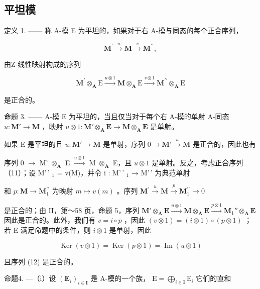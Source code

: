 \subsection{平坦模}

定义 1. —— 称 A-模 E 为平坦的，如果对于右 A-模与同态的每个正合序列，

\[
\mathbf {M} ^ {\prime} \xrightarrow {u} \mathbf {M} \xrightarrow {v} \mathbf {M} ^ {\prime \prime},\tag{11}
\]

由Z-线性映射构成的序列

\[
\mathbf {M} ^ {\prime} \otimes_ {\mathbf {A}} \mathrm{E} \xrightarrow {u \otimes 1} \mathbf {M} \otimes_ {\mathbf {A}} \mathrm{E} \xrightarrow {v \otimes 1} \mathbf {M} ^ {\prime \prime} \otimes_ {\mathbf {A}} \mathrm{E}\tag{12}
\]

是正合的。

命题 3. —— A-模 E 为平坦的，当且仅当对于每个右 A-模的单射 A-同态 \(u: \mathbf{M}' \to \mathbf{M}\) ，映射 \(u \otimes 1: \mathbf{M}' \otimes_{\mathbf{A}} \mathbf{E} \to \mathbf{M} \otimes_{\mathbf{A}} \mathbf{E}\) 是单射。

如果 E 是平坦的且 \(u: \mathbf{M}' \to \mathbf{M}\) 是单射，序列 \(0 \longrightarrow \mathbf{M}' \stackrel{u}{\longrightarrow} \mathbf{M}\) 是正合的，因此也有

序列 0 \(\longrightarrow\) M' \(\otimes_{\mathbf{A}}\) E \(\xrightarrow{u\otimes1}\) M \(\otimes_{\mathbf{A}}\) E，且 \(u\otimes1\) 是单射。反之，考虑正合序列（11）；设 M'\,' \(_{1}\) = v(M)，并令 i : M'\,' \(_{1}\) → M'\,' 为典范单射

和 \(p:\mathbf{M}\to\mathbf{M}_{1}^{\prime\prime}\) 为映射 \(m\mapsto v(m)\) 。序列 \(\mathbf{M}^{\prime}\xrightarrow{u}\mathbf{M}\xrightarrow{p}\mathbf{M}_{1}^{\prime\prime}\longrightarrow0\)

是正合的；由 II，第～58 页，命题 5，序列 \(\mathbf{M}' \otimes_{\mathbf{A}} \mathbf{E} \xrightarrow{u \otimes 1} \mathbf{M} \otimes_{\mathbf{A}} \mathbf{E} \xrightarrow{p \otimes 1} \mathbf{M}_{1}'' \otimes_{\mathbf{A}} \mathbf{E}\) 因此是正合的。此外，我们有 \(v = i \circ p\) ，因此 \((v \otimes 1) = (i \otimes 1) \circ (p \otimes 1)\) ；若 E 满足命题中的条件，则 \(i \otimes 1\) 是单射，因此

\[
\operatorname{Ker} (v \otimes 1) = \operatorname{Ker} (p \otimes 1) = \operatorname{Im} (u \otimes 1)
\]

且序列 (12) 是正合的。

命题4. ---（i）设 \((\mathbf{E}_i)_{i\in \mathbf{I}}\) 是 A-模的一个族， \(\mathrm{E} = \bigoplus_{i\in \mathbf{I}}\mathrm{E}_i\) 它们的直和

